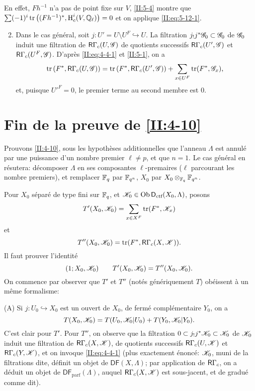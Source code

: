 En effet, $F h^{-1}$ n'a pas de point fixe sur $V$, \ref{II:5-4} montre que 
$\sum (-1)^i \operatorname{tr}\left((F h^{-1})^*,\operatorname{H}_c^i(V,\mathbb{Q}_\ell)\right)=0$ et on 
applique \eqref{II:eq:5-12-1}.
\begin{enumerate}[\indent A.]
\setcounter{enumi}{1}
  \item Dans le cas g\'en\'eral, soit $j:U'=U\setminus U^F\hookrightarrow U$. 
    La filtration  $j_! j^* \mathscr{G}_0\subset \mathscr{G}_0$ de $\mathscr{G}_0$ induit une 
    filtration de $\mathsf{R}\Gamma_c(U,\mathscr{G})$ de quotients successifs 
    $\mathsf{R}\Gamma_c(U',\mathscr{G})$ et $\mathsf{R}\Gamma_c(U^F,\mathscr{G})$. D'apr\`es \eqref{II:eq:4-4-1} 
    et \ref{II:5-1}, on a 
    \[
      \operatorname{tr}\left(F^*,\mathsf{R}\Gamma_c(U,\mathscr{G})\right) = \operatorname{tr}\left(F^*,\mathsf{R}\Gamma_c(U',\mathscr{G})\right) + \sum_{x\in U^F} \operatorname{tr}(F^*,\mathscr{G}_x) \text{,}
    \]
    et, puisque ${U'}^F=0$, le premier terme au second membre est $0$. 
\end{enumerate}










\section{Fin de la preuve de \ref{II:4-10}}\label{II:6}

Prouvons \ref{II:4-10}, sous les hypoth\`eses additionnelles que l'anneau 
$\Lambda$ est annul\'e par une puissance d'un nombre premier $\ell\ne p$, et 
que $n=1$. Le cas g\'en\'eral en r\'esutera: d\'ecomposer $\Lambda$ en ses 
composantes $\ell$-premaires ($\ell$ parcourant les nombre premiers), et 
remplacer $\mathbb{F}_q$ par $\mathbb{F}_{q^n}$, $X_0$ par $X_0\otimes_{\mathbb{F}_q}\mathbb{F}_{q^n}$. 

Pour $X_0$ s\'epar\'e de type fini sur $\mathbb{F}_q$, et 
$\mathscr{K}_0\in\operatorname{Ob}\mathsf{D}_\text{ctf}(X_0,\Lambda)$, posons 
\[
  T'(X_0,\mathscr{K}_0) = \sum_{x\in X^F} \operatorname{tr}(F^*,\mathscr{K}_x)
\]
et
\[
  T''(X_0,\mathscr{K}_0) = \operatorname{tr}(F^*,\mathsf{R}\Gamma_c(X,\mathscr{K})) \text{.}
\]
Il faut prouver l'identit\'e 
\[
  (1;X_0,\mathscr{K}_0) \qquad T'(X_0,\mathscr{K}_0) = T''(X_0,\mathscr{K}_0) \text{.}
\]
On commence par observer que $T'$ et $T''$ (not\'es g\'en\'eriquement $T$) 
ob\'eissent \`a un m\^eme formalisme:

(A) Si $j:U_0\hookrightarrow X_0$ est un ouvert de $X_0$, de ferm\'e 
compl\'ementaire $Y_0$, on a 
\[
  T(X_0,\mathscr{K}_0) = T(U_0,\mathscr{K}_0|U_0) + T(Y_0,\mathscr{K}_0|Y_0) \text{.}
\]
C'est clair pour $T'$. Pour $T''$, on observe que la filtration 
$0\subset j_! j^* \mathscr{K}_0\subset \mathscr{K}_0$ de $\mathscr{K}_0$ induit une filtration de 
$\mathsf{R}\Gamma_c(X,\mathscr{K})$, de quotients successifs $\mathsf{R}\Gamma_c(U,\mathscr{K})$ et 
$\mathsf{R}\Gamma_c(Y,\mathscr{K})$, et on invoque \eqref{II:eq:4-4-1} (plus exactement 
\'enonc\'e: $\mathscr{K}_0$, muni de la filtrations dite, d\'efinit un objet de 
$\mathsf{DF}(X,\Lambda)$; par application de $\mathsf{R}\Gamma_c$, on a d\'eduit un 
objet de $\mathsf{DF}_\text{parf}(\Lambda)$, auquel $\mathsf{R}\Gamma_c(X,\mathscr{K})$ est 
sous-jacent, et de gradu\'e comme dit). 

